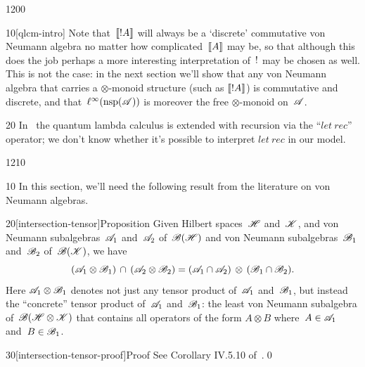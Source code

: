 \begin{parsec}{1200}
\begin{point}{10}[qlcm-intro]
Note that~$\llbracket!A\rrbracket$
will always be a `discrete' commutative von Neumann algebra
no matter how complicated~$\llbracket A\rrbracket$ may be,
so that although this does the job
perhaps a more interesting interpretation of~$\mathord{!}$
may be chosen as well.
This is not the case:
in the next
section we'll show that
any von Neumann algebra
that carries 
a $\otimes$-monoid structure
(such as $\llbracket!A\rrbracket$)
is commutative and discrete,
and that~$\ell^\infty(\mathrm{nsp}(\mathscr{A}))$
is moreover the free $\otimes$-monoid
on~$\mathscr{A}$.
\end{point}
\begin{point}{20}%
In~\cite{qlc} the quantum lambda calculus
is extended with recursion via the ``$let\ rec$''
operator;
we don't know whether it's possible to interpret
    $let\ rec$ in our model.
\end{point}
\end{parsec}
\begin{parsec}{1210}%
\begin{point}{10}%
In this section,
we'll need the following result
from the literature on von Neumann algebras.
\end{point}
\begin{point}{20}[intersection-tensor]{Proposition}%
Given Hilbert spaces~$\mathscr{H}$ and~$\mathscr{K}$,
and von Neumann subalgebras~$\mathscr{A}_1$ and~$\mathscr{A}_2$
of~$\mathscr{B}(\mathscr{H})$
and von Neumann subalgebras~$\mathscr{B}_1$ and~$\mathscr{B}_2$
of~$\mathscr{B}(\mathscr{K})$,
we have 
\begin{equation*}
(\mathscr{A}_1 \otimes  \mathscr{B}_1)\,\cap\,
(\mathscr{A}_2 \otimes \mathscr{B}_2)
= (\mathscr{A}_1\cap\mathscr{A}_2)\,\otimes\,
(\mathscr{B}_1\cap \mathscr{B}_2).
\end{equation*}
Here
$\mathscr{A}_1 \otimes \mathscr{B}_1$
denotes not just any tensor product of~$\mathscr{A}_1$ and~$\mathscr{B}_1$,
but instead
the ``concrete'' tensor product 
of~$\mathscr{A}_1$ and~$\mathscr{B}_1$:
the least von Neumann subalgebra of~$\mathscr{B}(\mathscr{H}\otimes\mathscr{K})$
that contains all operators
of the form $A\otimes B$ where~$A\in\mathscr{A}_1$
and~$B\in\mathscr{B}_1$.
\begin{point}{30}[intersection-tensor-proof]{Proof}%
See Corollary IV.5.10 of~\cite{Takesaki1}.\qed
\end{point}
\end{point}
\end{parsec}
